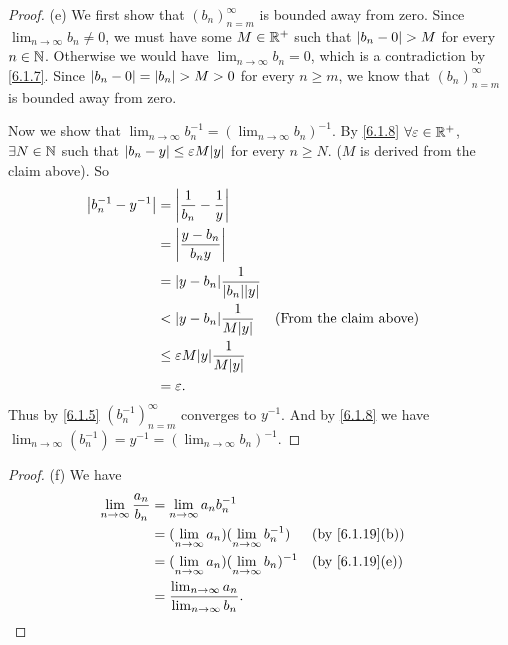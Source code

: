 \begin{proof}{(e)}
  We first show that \((b_n)_{n = m}^\infty\) is bounded away from zero.
  Since \(\lim_{n \to \infty} b_n \neq 0\), we must have some \(M \in \mathbb{R}^+\) such that \(\left\lvert b_n - 0\right\rvert > M\) for every \(n \in \mathbb{N}\).
  Otherwise we would have \(\lim_{n \to \infty} b_n = 0\), which is a contradiction by \cref{6.1.7}.
  Since \(\left\lvert b_n - 0\right\rvert = \left\lvert b_n\right\rvert > M > 0\) for every \(n \geq m\), we know that \((b_n)_{n = m}^\infty\) is bounded away from zero.

  Now we show that \(\lim_{n \to \infty} b_n^{-1} = (\lim_{n \to \infty} b_n)^{-1}\).
  By \cref{6.1.8} \(\forall \varepsilon \in \mathbb{R}^+\), \(\exists N \in \mathbb{N}\) such that \(\abs{b_n - y} \leq \varepsilon M \abs{y}\) for every \(n \geq N\).
  (\(M\) is derived from the claim above).
  So
  \begin{align*}
    \abs{b_n^{-1} - y^{-1}} & = \abs{\dfrac{1}{b_n} - \dfrac{1}{y}}                                           \\
                            & = \abs{\dfrac{y - b_n}{b_n y}}                                                  \\
                            & = \abs{y - b_n}\dfrac{1}{\abs{b_n}\abs{y}}                                      \\
                            & < \abs{y - b_n}\dfrac{1}{M\abs{y}}           &  & \text{(From the claim above)} \\
                            & \leq \varepsilon M\abs{y}\dfrac{1}{M\abs{y}}                                    \\
                            & = \varepsilon.
  \end{align*}
  Thus by \cref{6.1.5} \((b_n^{-1})_{n = m}^\infty\) converges to \(y^{-1}\).
  And by \cref{6.1.8} we have \(\lim_{n \to \infty} (b_n^{-1}) = y^{-1} = (\lim_{n \to \infty} b_n)^{-1}\).
\end{proof}

\begin{proof}{(f)}
  We have
  \begin{align*}
    \lim_{n \to \infty} \dfrac{a_n}{b_n} & = \lim_{n \to \infty} a_n b_n^{-1}                                                            \\
                                         & = (\lim_{n \to \infty} a_n)(\lim_{n \to \infty} b_n^{-1})   &  & \text{(by \cref{6.1.19}(b))} \\
                                         & = (\lim_{n \to \infty} a_n)(\lim_{n \to \infty} b_n)^{-1}   &  & \text{(by \cref{6.1.19}(e))} \\
                                         & = \dfrac{\lim_{n \to \infty} a_n}{\lim_{n \to \infty} b_n}.
  \end{align*}
\end{proof}

